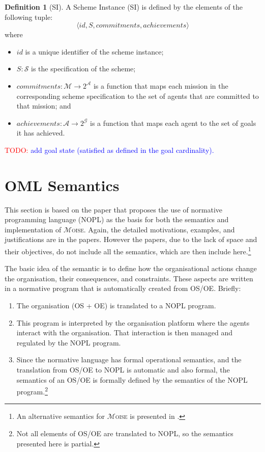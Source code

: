 \documentclass{article}
\newcommand{\moise}{{$\mathcal{M}$\textsc{oise}}\xspace}
\newcommand{\todo}[1]{\textcolor{red}{TODO: }\textcolor{blue}{#1}}
\newcommand{\set}[1]{\mathcal{#1}}
\theoremstyle{definition} \newtheorem{definition}{Definition}
\begin{document}
\begin{definition}[SI]
  A Scheme Instance (SI) is defined by the elements of the following tuple: 
  \begin{displaymath}
    \langle id, S, commitments, achievements \rangle
  \end{displaymath}
  where 
  \begin{itemize}
  \item $id$ is a unique identifier of the scheme instance;
  \item $S : \set{S}$ is the specification of the scheme;
  \item $commitments : \mathcal{M} \rightarrow 2^{\mathcal{A}}$ is  a
    function that maps each mission in the corresponding scheme
    specification to the set of agents that are committed to that
    mission; and
  \item $achievements : \mathcal{A} \rightarrow 2^{\mathcal{G}}$ is a
    function that maps each agent to the set of goals it has achieved.
  \end{itemize}
\end{definition}

\todo{add goal state (satisfied as defined in the goal cardinality).}


\section{OML Semantics} \label{sec:sem}

This section is based on the paper \cite{hubner:09e} that proposes the
use of normative programming language (NOPL) as the basis for both the
semantics and implementation of \moise. Again, the detailed
motivations, examples, and justifications are in the papers. However
the papers, due to the lack of space and their objectives, do not
include all the semantics, which are then include here.\footnote{An
  alternative semantics for \moise is presented in \cite{birna:10}.}

The basic idea of the semantic is to define how the organisational
actions change the organisation, their consequences, and constraints.
These aspects are written in a normative program that is automatically
created from OS/OE. Briefly:
\begin{enumerate}
\item The organisation (OS + OE) is translated to a NOPL program.
\item This program is interpreted by the organisation platform where
  the agents interact with the organisation. That interaction is then
  managed and regulated by the NOPL program.
\item Since the normative language has formal operational semantics,
  and the translation from OS/OE to NOPL is automatic and also formal,
  the semantics of an OS/OE is formally defined by the semantics of
  the NOPL program.\footnote{Not all elements of OS/OE are translated
    to NOPL, so the semantics presented here is partial.}
\end{enumerate}
\end{document}

